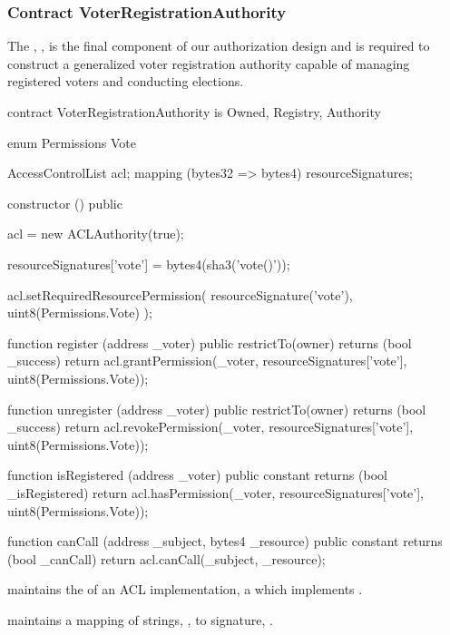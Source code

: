 \subsubsection{Contract VoterRegistrationAuthority}

The , , is the final
component of our authorization design and is required to construct a generalized
voter registration authority capable of managing registered voters and
conducting elections.

\begin{solidity}
contract VoterRegistrationAuthority is Owned, Registry, Authority {
  enum Permissions {
    Vote
  }

  AccessControlList acl;
  mapping (bytes32 => bytes4) resourceSignatures;

  constructor () public {
    acl = new ACLAuthority(true);

    resourceSignatures['vote'] = bytes4(sha3('vote()'));

    acl.setRequiredResourcePermission(
      resourceSignature('vote'),
      uint8(Permissions.Vote)
    );
  }

  function register (address _voter) public restrictTo(owner) returns (bool _success) {
    return acl.grantPermission(_voter, resourceSignatures['vote'], uint8(Permissions.Vote));
  }

  function unregister (address _voter) public restrictTo(owner) returns (bool _success) {
    return acl.revokePermission(_voter, resourceSignatures['vote'], uint8(Permissions.Vote));
  }

  function isRegistered (address _voter) public constant returns (bool _isRegistered) {
    return acl.hasPermission(_voter, resourceSignatures['vote'], uint8(Permissions.Vote));
  }

  function canCall (address _subject, bytes4 _resource) public constant returns (bool _canCall) {
    return acl.canCall(_subject, _resource);
  }
}
\end{solidity}


\begin{state}
  \begin{public}
    \item {} maintains the  of an ACL
      implementation, a  which implements .

    \item {} maintains a
      mapping of strings, , to  signature,
      .
  \end{public}
\end{state}

